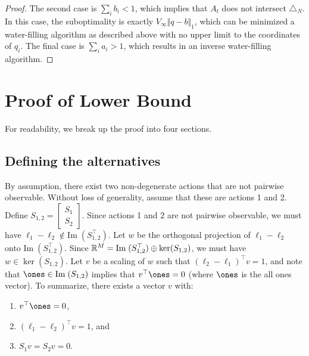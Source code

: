 \documentclass{article}
\newcommand{\im}{{\mathrm{Im}\;}}
\begin{document}
\begin{proof}
The second case is $\sum_i b_i < 1$, which implies that $A_t$ does not intersect $\triangle_N$. In this case, the suboptimality is exactly $V_\infty \Vert q - b\Vert_1$, which can be minimized a water-filling algorithm as described above with no upper limit to the coordinates of $q_i$. The final case is $\sum_i a_i > 1$, which results in an inverse water-filling algorithm.



\end{proof}

\section{Proof of Lower Bound}
\label{sec:lower.bound.proof}
For readability, we break up the proof into four sections. 

\subsection{Defining the alternatives}  
By assumption, there exist two non-degenerate actions that are not pairwise observable. Without loss of generality, assume that these are actions 1 and 2. Define $S_{1,2} = \begin{bmatrix} S_1 \\ S_2
\end{bmatrix}$. Since actions 1 and 2 are not pairwise observable, we must have $\ell_1 - \ell_2 \notin \im( S_{1,2}^\top)$. Let $w$ be the orthogonal projection of $\ell_1 - \ell_2$ onto $\im( S_{1,2}^\top)$. Since $\Reals^M = \im(S_{1,2}^\top) \oplus \ker (S_{1,2})$, we must have $w\in\ker (S_{1,2})$. Let $v$ be a scaling of $w$ such that $(\ell_2 - \ell_1)^\top v = 1$, and note that  $\ones\in\im(S_{1,2})$ implies that $v^\top \ones = 0$ (where $\ones$ is the all ones vector). To summarize, there exists a vector $v$ with:
\begin{enumerate}
\item $v^\top \ones = 0$,
\item $(\ell_1 - \ell_2)^\top v = 1$, and
\item $S_1v = S_2 v = 0$.
\end{enumerate}
\end{document}
